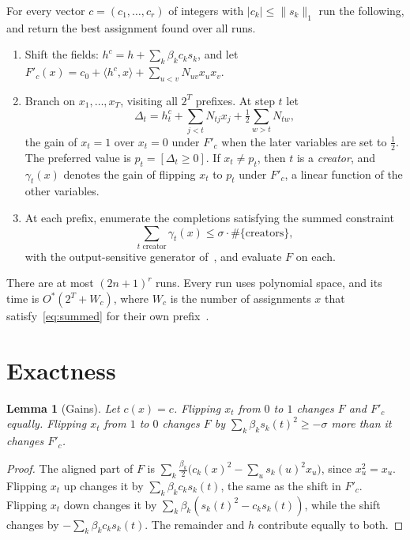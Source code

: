 \documentclass[11pt,a4paper]{article}
\newtheorem{lemma}[theorem]{Lemma}
\theoremstyle{definition}
\theoremstyle{remark}
\newcommand{\Ostar}{O^{*}}
\begin{document}
For every vector $c=(c_1,\dots,c_r)$ of integers with
$|c_k|\le\|s_k\|_1$ run the following, and return the best assignment found
over all runs.
\begin{enumerate}
 \item Shift the fields: $h^c=h+\sum_k\beta_kc_ks_k$, and let
 $F'_c(x)=c_0+\langle h^c,x\rangle+\sum_{u<v}N_{uv}x_ux_v$.
 \item Branch on $x_1,\dots,x_T$, visiting all $2^T$ prefixes. At step $t$
 let
 \[
  \Delta_t=h^c_t+\sum_{j<t}N_{tj}x_j+\tfrac12\sum_{w>t}N_{tw},
 \]
 the gain of $x_t=1$ over $x_t=0$ under $F'_c$ when the later variables are
 set to $\frac12$. The preferred value is $p_t=[\Delta_t\ge0]$. If $x_t\ne
 p_t$, then $t$ is a \emph{creator}, and $\gamma_t(x)$ denotes the gain of
 flipping $x_t$ to $p_t$ under $F'_c$, a linear function of the other
 variables.
 \item At each prefix, enumerate the completions satisfying the summed
 constraint
 \begin{equation}
  \sum_{t\text{ creator}}\gamma_t(x)\le\sigma\cdot\#\{\text{creators}\},
  \label{eq:summed}
 \end{equation}
 with the output-sensitive generator of~\cite{EE}, and evaluate $F$ on each.
\end{enumerate}
There are at most $(2n+1)^r$ runs. Every run uses polynomial space, and its
time is $\Ostar(2^T+W_c)$, where $W_c$ is the number of assignments $x$ that
satisfy~\eqref{eq:summed} for their own prefix~\cite[Lemma~2]{EE}.

\section{Exactness}\label{sec:exact}

\begin{lemma}[Gains]\label{lem:gain}
Let $c(x)=c$. Flipping $x_t$ from $0$ to $1$ changes $F$ and $F'_c$ equally.
Flipping $x_t$ from $1$ to $0$ changes $F$ by
$\sum_k\beta_ks_k(t)^2\ge-\sigma$ more than it changes $F'_c$.
\end{lemma}

\begin{proof}
The aligned part of $F$ is $\sum_k\frac{\beta_k}2\bigl(c_k(x)^2-\sum_u
s_k(u)^2x_u\bigr)$, since $x_u^2=x_u$. Flipping $x_t$ up changes it by
$\sum_k\beta_kc_ks_k(t)$, the same as the shift in $F'_c$. Flipping $x_t$
down changes it by $\sum_k\beta_k(s_k(t)^2-c_ks_k(t))$, while the shift
changes by $-\sum_k\beta_kc_ks_k(t)$. The remainder and $h$ contribute
equally to both.
\end{proof}
\end{document}
